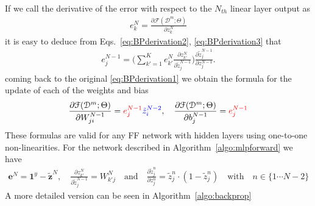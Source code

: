 %
If we call the derivative of the error with respect to the $N_{th}$ linear layer output as
\begin{align}
        e^{N}_k = \frac{\partial \mathcal{F}(\mathcal{D}^m;\Theta)}{\partial z_{k}^{N}}
\label{eq:BPderivation4}
\end{align}
%
\noindent it is easy to deduce from Eqs.~\ref{eq:BPderivation2}, \ref{eq:BPderivation3} that
%
\begin{align}
        e^{N-1}_j = \bigg(\sum_{k'=1}^{K} e^N_{k'} \frac{\partial z_{k'}^{N}}{\partial \tilde{z}_{j}^{N-1}}\bigg)\frac{\partial \tilde{z}_{j}^{N-1}}{\partial z_{j}^{N-1}}.
\label{eq:BPderivation5}
\end{align}
%
\noindent coming back to the original \ref{eq:BPderivation1} we obtain the formula for the update of each of the weights and bias
%
\begin{align}
        \frac{\partial \mathcal{F}(\mathcal{D}^m;\Theta)}{\partial W_{ji}^{N-1}}  = {\color{red} e^{N-1}_j} {\color{blue} \tilde{z}_i^{N-2}},  \quad \frac{\partial \mathcal{F}(\mathcal{D}^m;\Theta)}{\partial b_{j}^{N-1}}  = {\color{red} e^{N-1}_j}
\label{eq:BPderivation6}
\end{align}
%
These formulas are valid for any FF network with hidden layers using one-to-one non-linearities. For the network described in Algorithm~\ref{algo:mlpforward} we have
%
\begin{align}
        \mathbf{e}^{N} =  \mathrm{\mathbf{1}}^{y} - \tilde{\mathbf{z}}^N,
  \quad
        \frac{\partial z_{k'}^N}{\partial \tilde{z}_j^{N-1}} = W_{k'j}^N \quad \mbox{and} \quad
        \frac{\partial \tilde{z}_{j}^n}{\partial z_{j}^n} = \tilde{z}^n_{j}\cdot (1-\tilde{z}^n_{j}) \quad \mbox{with} \quad n \in \{1 \cdots N-2\}
\label{eq:BPderivation7}
\end{align}
%
A more detailed version can be seen in Algorithm~\ref{algo:backprop}

